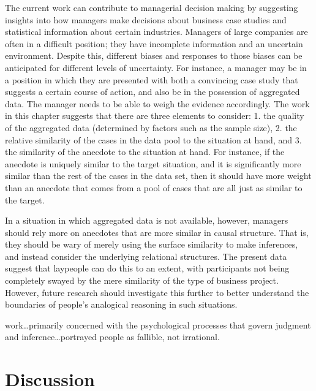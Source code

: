 \documentclass[a4paper, nobind, dvipsnames]{templates/ociamthesis}
\theoremstyle{definition}
\theoremstyle{definition}
\theoremstyle{definition}
\theoremstyle{definition}
\theoremstyle{remark}
\begin{document}
The current work can contribute to managerial decision making by suggesting
insights into how managers make decisions about business case studies and
statistical information about certain industries. Managers of large companies
are often in a difficult position; they have incomplete information and an
uncertain environment. Despite this, different biases and responses to those
biases can be anticipated for different levels of uncertainty. For instance, a
manager may be in a position in which they are presented with both a convincing
case study that suggests a certain course of action, and also be in the
possession of aggregated data. The manager needs to be able to weigh the
evidence accordingly. The work in this chapter suggests that there are three
elements to consider: 1. the quality of the aggregated data (determined by
factors such as the sample size), 2. the relative similarity of the cases in the
data pool to the situation at hand, and 3. the similarity of the anecdote to the
situation at hand. For instance, if the anecdote is uniquely similar to the
target situation, and it is significantly more similar than the rest of the
cases in the data set, then it should have more weight than an anecdote that
comes from a pool of cases that are all just as similar to the target.

In a situation in which aggregated data is not available, however, managers
should rely more on anecdotes that are more similar in causal structure. That
is, they should be wary of merely using the surface similarity to make
inferences, and instead consider the underlying relational structures. The
present data suggest that laypeople can do this to an extent, with participants
not being completely swayed by the mere similarity of the type of business
project. However, future research should investigate this further to better
understand the boundaries of people's analogical reasoning in such situations.

\newpage

\printbibliography[segment=\therefsegment,heading=subbibintoc]



\begin{savequote}
work\ldots primarily concerned with the psychological processes that
govern judgment and inference\ldots portrayed people as fallible, not
irrational.
\end{savequote}

\hypertarget{discussion}{%
\chapter{Discussion}\label{discussion}}
\end{document}
